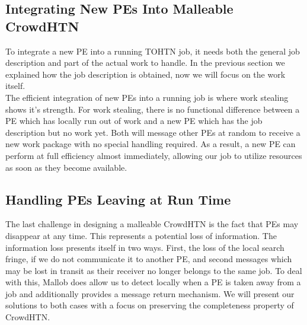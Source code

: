 \subsection{Integrating New PEs Into Malleable CrowdHTN}
To integrate a new PE into a running TOHTN job, it needs both the general job description and part of the actual work to handle. In the previous section we explained how the job description is obtained, now we will focus on the work itself. \\
The efficient integration of new PEs into a running job is where work stealing shows it's strength. For work stealing, there is no functional difference between a PE which has locally run out of work and a new PE which has the job description but no work yet. Both will message other PEs at random to receive a new work package with no special handling required. As a result, a new PE can perform at full efficiency almost immediately, allowing our job to utilize resources as soon as they become available.
\begin{comment}
- work stealing makes this easy
- there is functionally no difference between a new PE and a PE which has locally run out of work
- no special handling required at all

- only setup work: parsing, initiating heuristic
- CrowdHTN may be less efficient, but can work immediately, make use of very short-lived PEs
\end{comment}

\subsection{Handling PEs Leaving at Run Time}
The last challenge in designing a malleable CrowdHTN is the fact that PEs may disappear at any time. This represents a potential loss of information. The information loss presents itself in two ways. First, the loss of the local search fringe, if we do not communicate it to another PE, and second messages which may be lost in transit as their receiver no longer belongs to the same job. To deal with this, Mallob does allow us to detect locally when a PE is taken away from a job and additionally provides a message return mechanism. We will present our solutions to both cases with a focus on preserving the completeness property of CrowdHTN.

